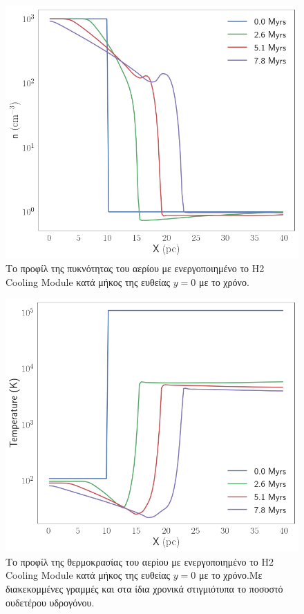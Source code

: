 \documentclass[article,a4paper,11.2pt]{memoir}
\numberwithin{equation}{subsection}
\begin{document}
\begin{figure}[h]
	\begin{adjustwidth}{-0cm}{-5cm}
	\includegraphics[width=1\linewidth]{DataImages/H2CoolingRHOprofile}
	\caption{Το προφίλ της πυκνότητας του αερίου με ενεργοποιημένο το Η2 Cooling Module κατά μήκος της ευθείας $y=0$ με το χρόνο.}
	\label{fig:h2coolingrhoprofile}
	\end{adjustwidth}
\end{figure}


\begin{figure}[h]
	\begin{adjustwidth}{-5cm}{-0cm}
	\includegraphics[width=1\linewidth]{DataImages/H2CoolingTMPprofile}
	\caption{Το προφίλ της θερμοκρασίας του αερίου με ενεργοποιημένο το Η2 Cooling Module κατά μήκος της ευθείας $y=0$ με το χρόνο.Με διακεκομμένες γραμμές και στα ίδια χρονικά στιγμιότυπα το ποσοστό ουδετέρου υδρογόνου.}
	\label{fig:h2coolingtmpprofile}
	\end{adjustwidth}
\end{figure}
\end{document}
